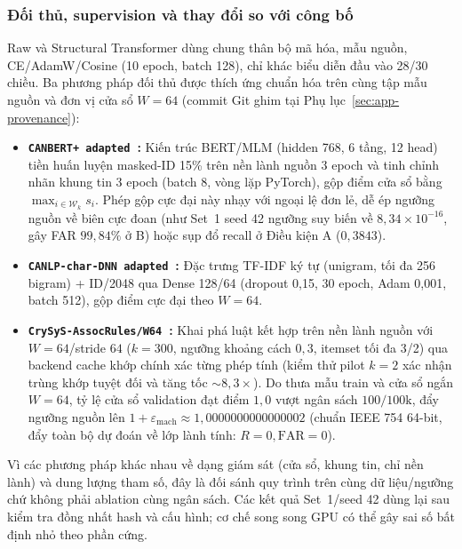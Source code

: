 \documentclass[12pt, a4paper, reqno, oneside]{book}
\DeclareRobustCommand{\code}[1]{\nolinkurl{#1}}
\begin{document}
\subsubsection{Đối thủ, supervision và thay đổi so với công bố}
Raw và Structural Transformer dùng chung thân bộ mã hóa, mẫu nguồn, CE/AdamW/Cosine (10 epoch, batch 128), chỉ khác biểu diễn đầu vào 28/30 chiều. Ba phương pháp đối thủ được thích ứng chuẩn hóa trên cùng tập mẫu nguồn và đơn vị cửa sổ $W=64$ (commit Git ghim tại Phụ lục~\ref{sec:app-provenance}):
\begin{itemize}
    \item \textbf{\code{CANBERT+ adapted}~\cite{won2026canbertplus}:} Kiến trúc BERT/MLM (hidden 768, 6 tầng, 12 head) tiền huấn luyện masked-ID 15\% trên nền lành nguồn 3 epoch và tinh chỉnh nhãn khung tin 3 epoch (batch 8, vòng lặp PyTorch), gộp điểm cửa sổ bằng $\max_{i\in\mathcal{W}_k} s_i$. Phép gộp cực đại này nhạy với ngoại lệ đơn lẻ, dễ ép ngưỡng nguồn về biên cực đoan (như Set~1 seed 42 ngưỡng suy biến về $8{,}34\times 10^{-16}$, gây FAR $99{,}84\%$ ở B) hoặc sụp đổ recall ở Điều kiện A ($0{,}3843$).
    \item \textbf{\code{CANLP-char-DNN adapted}~\cite{balasubramanian2025canlp}:} Đặc trưng TF-IDF ký tự (unigram, tối đa 256 bigram) + ID/2048 qua Dense 128/64 (dropout 0,15, 30 epoch, Adam 0,001, batch 512), gộp điểm cực đại theo $W=64$.
    \item \textbf{\code{CrySyS-AssocRules/W64}~\cite{koltai2026trust}:} Khai phá luật kết hợp trên nền lành nguồn với $W=64$/stride $64$ ($k=300$, ngưỡng khoảng cách $0{,}3$, itemset tối đa 3/2) qua backend cache khớp chính xác từng phép tính (kiểm thử pilot $k=2$ xác nhận trùng khớp tuyệt đối và tăng tốc $\sim 8{,}3\times$). Do thưa mẫu train và cửa sổ ngắn $W=64$, tỷ lệ cửa sổ validation đạt điểm $1{,}0$ vượt ngân sách $100/100\text{k}$, đẩy ngưỡng nguồn lên $1 + \varepsilon_{\text{mach}} \approx 1{,}0000000000000002$ (chuẩn IEEE 754 64-bit, đẩy toàn bộ dự đoán về lớp lành tính: $R=0, \text{FAR}=0$).
\end{itemize}
Vì các phương pháp khác nhau về dạng giám sát (cửa sổ, khung tin, chỉ nền lành) và dung lượng tham số, đây là đối sánh quy trình trên cùng dữ liệu/ngưỡng chứ không phải ablation cùng ngân sách. Các kết quả Set~1/seed 42 dùng lại sau kiểm tra đồng nhất hash và cấu hình; cơ chế song song GPU có thể gây sai số bất định nhỏ theo phần cứng.
\end{document}
